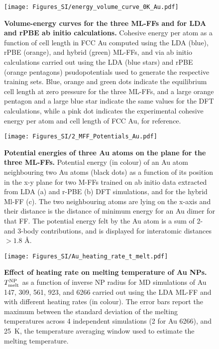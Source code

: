 \documentclass[%
aip,
 amsmath,amssymb,
 reprint,
]{revtex4-1}
\newcommand*\subt[1]{_{\textnormal{#1}}}
\newcommand*\supt[1]{^{\textnormal{#1}}}
\begin{document}
%
\begin{figure}[!htb]
    \centering
    \texttt{[image: Figures\_SI/energy\_volume\_curve\_0K\_Au.pdf]}
    \caption{
        \textbf{Volume-energy curves for the three ML-FFs and for LDA and rPBE ab initio calculations.}
        Cohesive energy per atom as a function of cell length in FCC Au computed using the LDA (blue), rPBE (orange), and hybrid (green) ML-FFs, and via ab initio calculations carried out using the LDA (blue stars) and rPBE (orange pentagons) psudopotentials used to generate the respective training sets.
    Blue, orange and green dots indicate the equilibrium cell length at zero pressure for the three ML-FFs, and a large orange pentagon and a large blue star indicate the same values for the DFT calculations, while a pink dot indicates the experimental cohesive energy \cite{kittel2005crystal} per atom and cell length \cite{davey1925precision} of FCC Au, for reference.}
    \label{fig:volume_energy_curves}
\end{figure}
%
\begin{figure*}[!htb]
    \centering
    \texttt{[image: Figures\_SI/2\_MFF\_Potentials\_Au.pdf]}
    \caption{
    \textbf{Potential energies of three Au atoms on the plane for the three ML-FFs.}
    Potential energy (in colour) of an Au atom neighbouring two Au atoms (black dots) as a function of its position in the x-y plane for two M-FFs trained on ab initio data extracted from LDA (a) and r-PBE (b) DFT simulations, and for the hybrid Ml-FF (c). 
    The two neighbouring atoms are lying on the x-axis and their distance is the distance of minimum energy for an Au dimer for that FF.
    The potential energy felt by the Au atom is a sum of 2- and 3-body contributions, and is displayed for interatomic distances $> 1.8$ $\text{\AA}$.}
    \label{fig:pes}
\end{figure*}
%
\begin{figure}[!htb]
    \centering
    \texttt{[image: Figures\_SI/Au\_heating\_rate\_t\_melt.pdf]}
    \caption{
    \textbf{Effect of heating rate on melting temperature of Au NPs.}
    $T\subt{melt}\supt{NP}$ as a function of inverse NP radius for MD simulations of Au 147, 309, 561, 923, and 6266 carried out using the LDA ML-FF and with different heating rates (in colour).
    The error bars report the maximum between the standard deviation of the melting temperatures across 4 independent simulations (2 for Au 6266), and 25~K, the temperature averaging window used to estimate the melting temperature.}
    \label{fig:heating_rate}
\end{figure}
\end{document}
